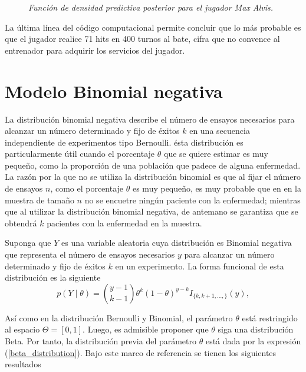 \begin{Eje}
    \begin{figure}[!h]
    \centering
    \caption{\emph{Funci\'on de densidad predictiva posterior para el jugador Max Alvis.}}
    \label{PredBinom}
    \end{figure}
    
    
    La \'ultima l\'inea del c\'odigo computacional permite concluir que lo m\'as probable es que el jugador realice 71 hits en 400 turnos al bate, cifra que no convence al entrenador para adquirir los servicios del jugador.
    \end{Eje}
    
    \section{Modelo Binomial negativa}
    
    La distribuci\'on binomial negativa describe el n\'umero de ensayos necesarios para alcanzar un n\'umero determinado y fijo de \'exitos $k$ en una secuencia independiente de experimentos tipo Bernoulli. \'esta distribuci\'on es particularmente \'util cuando el porcentaje $\theta$ que se quiere estimar es muy peque\~no, como la proporci\'on de una poblaci\'on que padece de alguna enfermedad. La raz\'on por la que no se utiliza la distribuci\'on binomial es que al fijar el n\'umero de ensayos $n$, como el porcentaje $\theta$ es muy peque\~no, es muy probable que en en la muestra de tama\~no $n$ no se encuetre ning\'un paciente con la enfermedad; mientras que al utilizar la distribuci\'on binomial negativa, de antemano se garantiza que se obtendr\'a $k$ pacientes con la enfermedad en la muestra.
    
    Suponga que $Y$ es una variable aleatoria cuya distribuci\'on es Binomial negativa que representa el n\'umero de ensayos necesarios $y$ para alcanzar un n\'umero determinado y fijo de \'exitos $k$ en un experimento. La forma funcional de esta distribuci\'on es la siguiente
    \begin{equation}
    p(Y \mid \theta)=\binom{y-1}{k-1}\theta^k(1-\theta)^{y-k}I_{\{k,k+1,\ldots,\}}(y),
    \end{equation}
    
    As\'i como en la distribuci\'on Bernoulli y Binomial, el par\'ametro $\theta$ est\'a restringido al espacio $\Theta=[0,1]$. Luego, es admisible proponer que $\theta$ siga una distribuci\'on Beta. Por tanto, la distribuci\'on previa del par\'ametro $\theta$ est\'a dada por la expresi\'on (\ref{beta_distribution}). Bajo este marco de referencia se tienen los siguientes resultados
    
